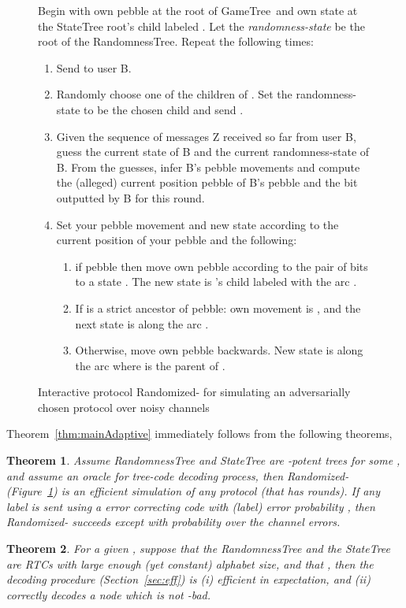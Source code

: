 \documentclass[ letterpaper, 11pt]{article}
\newtheorem{theorem}{Theorem}[section]
\newcommand{\gametree}{\textsf{GameTree}\xspace}
\newcommand{\statetree}{{\textsf{StateTree}}\xspace}
\newcommand{\randomtree}{{\textsf{RandomnessTree}}\xspace}
\newcommand{\potent}{potent\xspace}
\newcommand{\RTBC}{\textsf{RTC}\xspace}
\begin{document}
\begin{figure}[htb]
\begin{framed}
\small
Begin with own pebble at the root of \gametree\ and own state  at the \statetree root's child labeled
. Let the \emph{randomness-state}  be the root of the \randomtree.
Repeat the following  times:
\begin{enumerate}
\item Send  to user B.
\item Randomly choose one of the children of . Set the randomness-state  to be
the chosen child and send .
\item Given the sequence of messages Z received so far from user B, guess the
current state  of B and the current randomness-state  of B.
From the guesses, infer B's pebble movements and compute the
(alleged) current position pebble of B's pebble and the bit  outputted by B for this round.
\item Set your pebble movement and new state
according to the current position  of your pebble  and the following:
    \begin{enumerate}
    \item if pebble then move own pebble according to the pair of bits
     to a state .
    The new state is 's child labeled with the arc .
    \item If  is a strict ancestor of pebble: own movement is , and the
    next state is along the arc .
    \item Otherwise, move own pebble backwards. New state is along the arc 
    where  is the parent of .
    \end{enumerate}
\end{enumerate}
\end{framed}
\caption{Interactive protocol Randomized- for
  simulating an adversarially chosen protocol  over noisy channels}
\label{alg:protocolAdaptive}
\end{figure}

\vspace{0.5em plus 0.5em minus 0.2em}
Theorem~\ref{thm:mainAdaptive} immediately follows from the following theorems,
\begin{theorem}\label{thm:mainB}
Assume \randomtree and \statetree are -\potent
trees for some , and assume an oracle for tree-code decoding process,
then Randomized- (Figure~\ref{alg:protocolAdaptive}) is an efficient simulation
of any protocol  (that has  rounds).
If any label is sent using a error correcting code with (label) error probability
, then Randomized-
succeeds except with probability
 over the channel errors.
\end{theorem}
\begin{theorem}\label{thm:adaptiveEff}
For a given , suppose that
the \randomtree and the \statetree are \RTBC{s} with
large enough (yet constant) alphabet size,  
and that ,
then the decoding procedure (Section~\ref{sec:eff}) is
(i) efficient in expectation, and (ii) correctly decodes a node which is not -bad.
\end{theorem}
\end{document}
